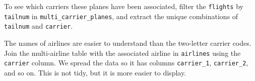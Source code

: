 \documentclass[]{book}
\newenvironment{Shaded}{\begin{snugshade}}{\end{snugshade}}
\newcommand{\CommentTok}[1]{\textcolor[rgb]{0.56,0.35,0.01}{\textit{#1}}}
\newcommand{\DataTypeTok}[1]{\textcolor[rgb]{0.13,0.29,0.53}{#1}}
\newcommand{\KeywordTok}[1]{\textcolor[rgb]{0.13,0.29,0.53}{\textbf{#1}}}
\newcommand{\NormalTok}[1]{#1}
\newcommand{\OperatorTok}[1]{\textcolor[rgb]{0.81,0.36,0.00}{\textbf{#1}}}
\newcommand{\StringTok}[1]{\textcolor[rgb]{0.31,0.60,0.02}{#1}}
\theoremstyle{plain}
\theoremstyle{remark}
\begin{document}
To see which carriers these planes have been associated, filter the
\texttt{flights} by \texttt{tailnum} in \texttt{multi\_carrier\_planes},
and extract the unique combinations of \texttt{tailnum} and
\texttt{carrier}.

\begin{Shaded}
\end{Shaded}

The names of airlines are easier to understand than the two-letter
carrier codes. Join the multi-airline table with the associated airline
in \texttt{airlines} using the \texttt{carrier} column. We spread the
data so it has columns \texttt{carrier\_1}, \texttt{carrier\_2}, and so
on. This is not tidy, but it is more easier to display.
\end{document}
